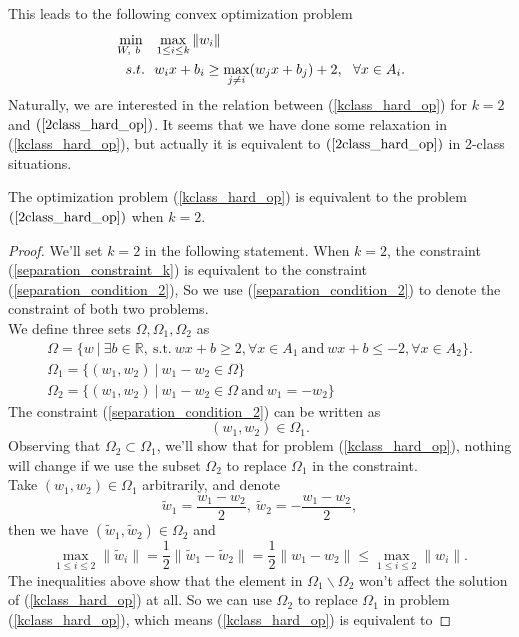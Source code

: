 This leads to the following convex optimization problem
\begin{align}{\label{kclass_hard_op}}
 \min_{W,~b~}~~&\max_{1\leq i\leq k}\|w_i\|\\
 s.t.~~&w_i x+b_i \geq \max_{j\neq i} (w_jx + b_j) + 2,~~\forall x\in A_i.
\end{align}
Naturally, we are interested in the relation between (\ref{kclass_hard_op}) for $k=2$ and $(\ref{2class_hard_op})$. It seems that we have done some relaxation in (\ref{kclass_hard_op}), but actually it is equivalent to $(\ref{2class_hard_op})$ in 2-class situations.
\begin{lemma}
The optimization problem (\ref{kclass_hard_op}) is equivalent to the problem $(\ref{2class_hard_op})$ when $k=2$.
\end{lemma} 
\begin{proof}
We'll set $k=2$ in the following statement. When $k=2$, the constraint (\ref{separation_constraint_k}) is equivalent to the constraint (\ref{separation_condition_2}), So we use (\ref{separation_condition_2}) to denote the constraint of both two problems. \\
We define three sets $\Omega,\Omega_1,\Omega_2$ as
\begin{gather}
\Omega = \{w~|~\exists b\in \mathbb{R},~\text{s.t.}~wx+b\geq 2, \forall x \in A_1~\text{and}~wx+b\leq -2, \forall x\in A_2\}.\\
\Omega_1 = \{(w_1,w_2)~|~w_1-w_2\in\Omega\}\\
\Omega_2 = \{(w_1,w_2)~|~w_1-w_2\in\Omega~\text{and}~w_1 = -w_2\}
\end{gather}
The constraint (\ref{separation_condition_2}) can be written as
\begin{equation}
(w_1,w_2)\in \Omega_1.
\end{equation}
Observing that $\Omega_2 \subset\Omega_1$, we'll show that for problem (\ref{kclass_hard_op}), nothing will change if we use the subset $\Omega_2$ to replace $\Omega_1$ in the constraint.\\
Take $(w_1,w_2)\in \Omega_1$ arbitrarily, and denote 
\[
\tilde{w}_1 = \frac{w_1-w_2}{2},~\tilde{w}_2 = -\frac{w_1-w_2}{2},
\]
then we have $(\tilde{w}_1,\tilde{w}_2)\in \Omega_2$ and
\begin{equation}
\max_{1\leq i\leq 2}\|\tilde{w}_i\| = \frac{1}{2} \|\tilde{w}_1-\tilde{w}_2\| = \frac{1}{2}\|w_1-w_2\| \leq \max_{1\leq i\leq 2}\|w_i\|.
\end{equation}
The inequalities above show that the element in $\Omega_1\backslash\Omega_2$ won't affect the solution of (\ref{kclass_hard_op}) at all. So we can use  $\Omega_2$ to replace $\Omega_1$ in problem (\ref{kclass_hard_op}), which means (\ref{kclass_hard_op}) is equivalent to 

\end{proof}
